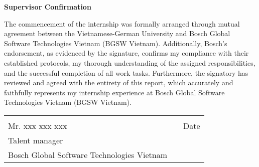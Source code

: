 \centerline{\LARGE \textbf{Supervisor Confirmation}}

\vspace{10mm}

The commencement of the internship was formally arranged through mutual agreement between the Vietnamese-German University and Bosch Global Software Technologies Vietnam (BGSW Vietnam). Additionally, Bosch’s endorsement, as evidenced by the signature, confirms my compliance with their established protocols, my thorough understanding of the assigned responsibilities, and the successful completion of all work tasks. Furthermore, the signatory has reviewed and agreed with the entirety of this report, which accurately and faithfully represents my internship experience at Bosch Global Software Technologies Vietnam (BGSW Vietnam).

\vfill

\begin{tabular}{@{}p{3.5in}p{0.1in}p{1.5in}@{}}
  \hrulefill & & \hrulefill \\
    Mr. xxx xxx xxx & & Date \\
    Talent manager & & \\
    Bosch Global Software Technologies Vietnam & & \\
\end{tabular}